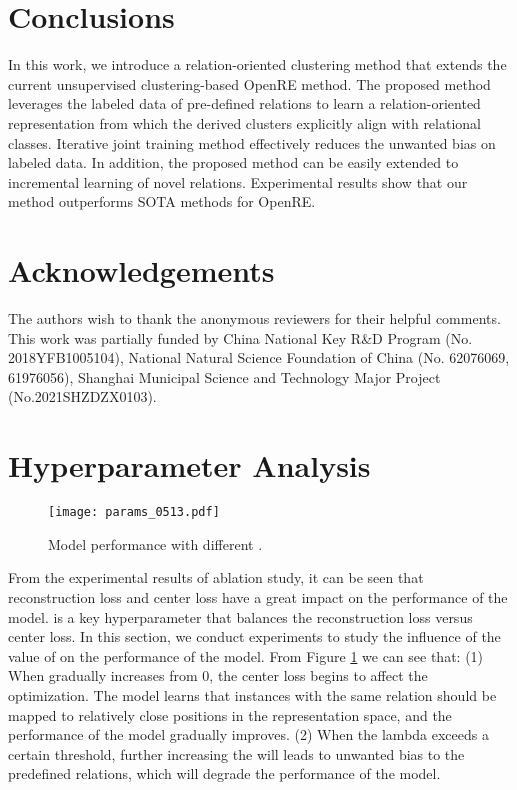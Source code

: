 \documentclass[11pt]{article}
\begin{document}
    
\section{Conclusions}
    In this work, we introduce a relation-oriented clustering method that extends the current unsupervised clustering-based OpenRE method. The proposed method leverages the labeled data of pre-defined relations to learn a relation-oriented representation from which the derived clusters explicitly align with relational classes. Iterative joint training method effectively reduces the unwanted bias on labeled data.
In addition, the proposed method can be easily extended to incremental learning of novel relations. Experimental results show that our method outperforms SOTA methods for OpenRE.
    
\section*{Acknowledgements}
The authors wish to thank the anonymous reviewers for their helpful comments. This work was partially funded by China National Key R\&D Program (No. 2018YFB1005104), National Natural Science Foundation of China (No.  62076069, 61976056), Shanghai Municipal Science and Technology Major Project (No.2021SHZDZX0103).





\appendix
\section{Hyperparameter Analysis}
        \label{app:Hyper}
        \begin{figure}[t]
            \texttt{[image: params\_0513.pdf]}
            \caption{Model performance with different .}
            \label{fig:lambda}
        \end{figure}
        From the experimental results of ablation study, it can be seen that reconstruction loss and center loss have a great impact on the performance of the model.  is a key hyperparameter that balances the reconstruction loss versus center loss. In this section, we conduct experiments to study the influence of the value of  on the performance of the model. From Figure \ref{fig:lambda} we can see that: (1) When  gradually increases from 0, the center loss begins to affect the optimization. The model learns that instances with the same relation should be mapped to relatively close positions in the representation space, and the performance of the model gradually improves. (2) When the lambda exceeds a certain threshold, further increasing the  will leads to unwanted bias to the predefined relations, which will degrade the performance of the model.
        
\end{document}
